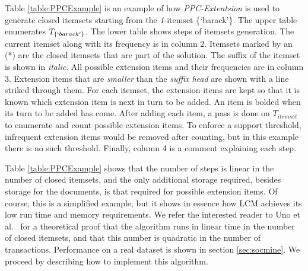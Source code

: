 \documentclass{sig-alternate}
\begin{document}
Table \ref{table:PPCExample} is an example of how \emph{PPC-Extentsion} is
used to generate closed itemsets starting from the
\emph{1}-itemset \{`barack'\}.
The upper table enumerates $T_{\{`barack'\}}$.
The lower table shows steps of itemsets generation.
The current itemset along with its frequency is in column 2.
Itemsets marked by an (*) are the closed itemsets that are part of the solution.
The suffix of the itemset is shown in \emph{italic}. 
All possible extension items and their frequencies are in column 3. 
Extension items that are \emph{smaller} than the \emph{suffix head} 
are shown with a line striked through them. 
For each itemset, the extension items are kept 
so that it is known which extension item 
is next in turn to be added.
An item is bolded when its turn to be added has come.
After adding each item, a pass is done on $T_{itemset}$ to 
enumerate and count possible extension items.
To enforce a support threshold, infrequent extension items would be removed
after counting, 
but in this example there is no such threshold.
Finally, column 4 is a comment explaining each step.


Table \ref{table:PPCExample} shows that the number of steps is linear in the number of closed itemsets,
and the only additional storage required, besides storage for the documents,
is that required for possible extension items.
Of course, this is a simplified example, but it shows in essence how LCM
achieves its low run time and memory requirements.
We refer the interested reader to Uno et al.~\cite{uno2004lcm} for a
theoretical proof that the algorithm runs in linear time in the number of
closed itemsets,
and that this number is quadratic in the number of transactions.
Performance on a real dataset is shown in section \ref{sec:socmine}.
We proceed by describing how to implement this algorithm. 
\end{document}

